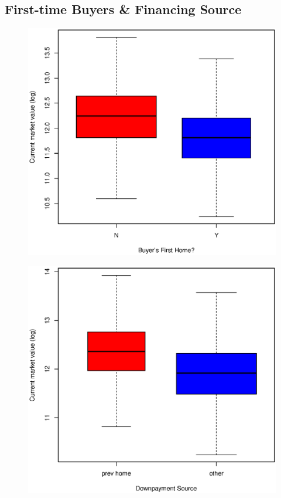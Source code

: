 \documentclass[11pt, fleqn]{article}
\begin{document}
\subsection{First-time Buyers \& Financing Source}

\begin{figure}[!htb]
  \centering
  \includegraphics[scale=.5]{frstho.eps}
  \caption{}
  \label{fig:frstho}
\end{figure}

\begin{figure}[!htb]
  \centering
  \includegraphics[scale=.5]{dwnpay.eps}
  \caption{}
  \label{fig:dwnpay}
\end{figure}
\end{document}
